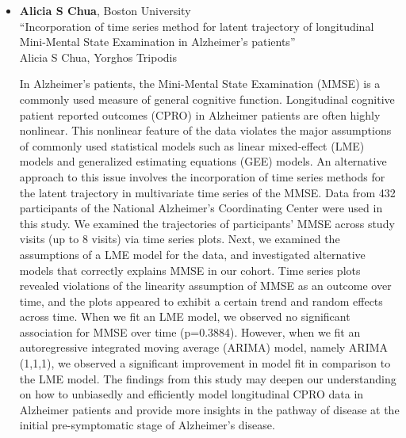 \begin{itemize}
\item \textbf{Alicia S Chua}, Boston University \\
``Incorporation of time series method for latent trajectory of longitudinal Mini-Mental State Examination in Alzheimer’s patients'' \\
Alicia S Chua, Yorghos Tripodis


In Alzheimer’s patients, the Mini-Mental State Examination (MMSE) is a commonly used measure of general cognitive function. Longitudinal cognitive patient reported outcomes (CPRO) in Alzheimer patients are often highly nonlinear. This nonlinear feature of the data violates the major assumptions of commonly used statistical models such as linear mixed-effect (LME) models and generalized estimating equations (GEE) models. An alternative approach to this issue involves the incorporation of time series methods for the latent trajectory in multivariate time series of the MMSE. Data from 432 participants of the National Alzheimer’s Coordinating Center were used in this study. We examined the trajectories of participants’ MMSE across study visits (up to 8 visits) via time series plots. Next, we examined the assumptions of a LME model for the data, and investigated alternative models that correctly explains MMSE in our cohort. Time series plots revealed violations of the linearity assumption of MMSE as an outcome over time, and the plots appeared to exhibit a certain trend and random effects across time. When we fit an LME model, we observed no significant association for MMSE over time (p=0.3884). However, when we fit an autoregressive integrated moving average (ARIMA) model, namely ARIMA (1,1,1), we observed a significant improvement in model fit in comparison to the LME model. The findings from this study may deepen our understanding on how to unbiasedly and efficiently model longitudinal CPRO data in Alzheimer patients and provide more insights in the pathway of disease at the initial pre-symptomatic stage of Alzheimer’s disease.

\end{itemize}

